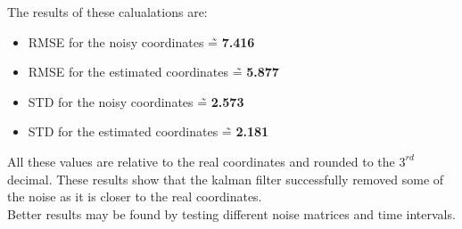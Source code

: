 \documentclass[conference]{IEEEtran}
\begin{document}
        The results of these calualations are:
        \begin{itemize}
            \item RMSE for the noisy coordinates \~= \textbf{7.416}
            \item RMSE for the estimated coordinates \~= \textbf{5.877}
            \item STD for the noisy coordinates \~= \textbf{2.573}
            \item STD for the estimated coordinates \~= \textbf{2.181}
        \end{itemize}
        All these values are relative to the real coordinates and rounded to the $3^{rd}$ decimal.
        These results show that the kalman filter successfully removed some of the noise as it is closer to the real coordinates.\\ 
        Better results may be found by testing different noise matrices and time intervals.
        

\appendix
\end{document}
